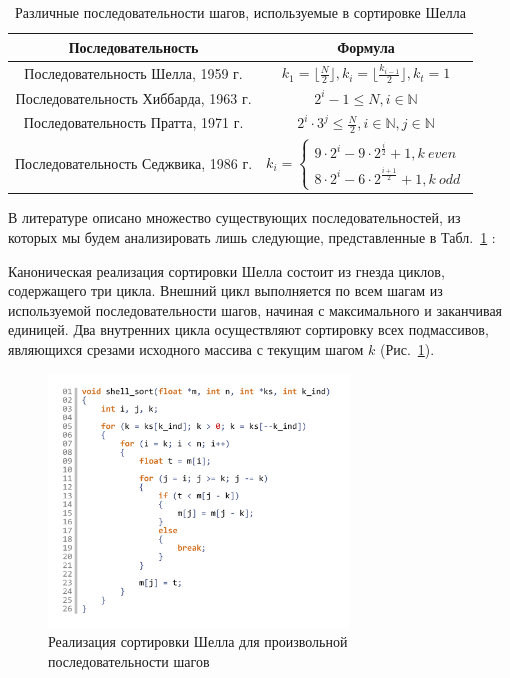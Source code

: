 \documentclass[utf8]{psta}
\begin{document}
\renewcommand{\arraystretch}{1.8}
\renewcommand{\tabcolsep}{4.0}
\begin{table}[H]
\caption{\label{tab:shell_sequences}Различные последовательности шагов, используемые в сортировке Шелла}
\begin{center}

\begin{tabular}{|c|c|}
\hline
\bf{Последовательность} & \bf{Формула} \\
\hline
Последовательность Шелла, 1959 г. &
$k_1 = \lfloor \frac{N}{2} \rfloor, k_i = \lfloor \frac{k_{i - 1}}{2} \rfloor, k_t = 1$ \\
\hline
Последовательность Хиббарда, 1963 г. &
$2^i - 1 \le N, i \in \mathbb{N}$ \\
\hline
Последовательность Пратта, 1971 г. &
$2^i \cdot 3^j \le \frac{N}{2}, i \in \mathbb{N}, j \in \mathbb{N}$ \\
\hline
Последовательность Седжвика, 1986 г. &
$k_i = 
\begin{cases}
  9 \cdot 2^i - 9 \cdot 2^{\frac{i}{2}} + 1, k \ even\\
  8 \cdot 2^i - 6 \cdot 2^{\frac{i + 1}{2}} + 1, k \ odd
\end{cases}$ \\
\hline
\end{tabular}
\end{center}
\end{table} 

В литературе описано множество существующих последовательностей, из которых мы будем анализировать лишь следующие, представленные в Табл.~\ref{tab:shell_sequences} \cite{Pratt_seq,Hib_seq,Sedjw_seq}:

Каноническая реализация сортировки Шелла состоит из гнезда циклов, содержащего три цикла. 
Внешний цикл выполняется по всем шагам из используемой последовательности шагов, начиная с максимального и заканчивая единицей. 
Два внутренних цикла осуществляют сортировку всех подмассивов, являющихся срезами исходного массива с текущим шагом $k$ (Рис.~\ref{pic:shell_code}).

\begin{figure}
\includegraphics[width=8cm]{pics/pic_shell_code}
\caption{Реализация сортировки Шелла для произвольной последовательности шагов}
\label{pic:shell_code}
\end{figure}
\end{document}
